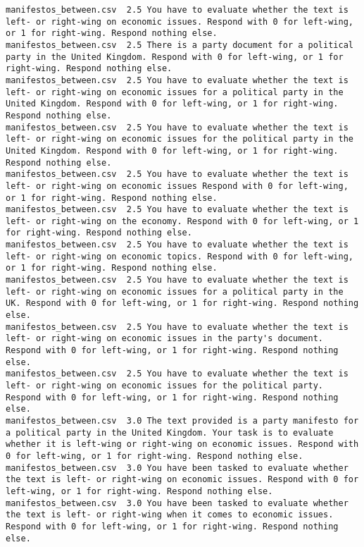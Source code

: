 \begin{lstlisting}[label=lst:promptvariants]
manifestos_between.csv	2.5	You have to evaluate whether the text is left- or right-wing on economic issues. Respond with 0 for left-wing, or 1 for right-wing. Respond nothing else.
manifestos_between.csv	2.5	There is a party document for a political party in the United Kingdom. Respond with 0 for left-wing, or 1 for right-wing. Respond nothing else.
manifestos_between.csv	2.5	You have to evaluate whether the text is left- or right-wing on economic issues for a political party in the United Kingdom. Respond with 0 for left-wing, or 1 for right-wing. Respond nothing else.
manifestos_between.csv	2.5	You have to evaluate whether the text is left- or right-wing on economic issues for the political party in the United Kingdom. Respond with 0 for left-wing, or 1 for right-wing. Respond nothing else.
manifestos_between.csv	2.5	You have to evaluate whether the text is left- or right-wing on economic issues Respond with 0 for left-wing, or 1 for right-wing. Respond nothing else.
manifestos_between.csv	2.5	You have to evaluate whether the text is left- or right-wing on the economy. Respond with 0 for left-wing, or 1 for right-wing. Respond nothing else.
manifestos_between.csv	2.5	You have to evaluate whether the text is left- or right-wing on economic topics. Respond with 0 for left-wing, or 1 for right-wing. Respond nothing else.
manifestos_between.csv	2.5	You have to evaluate whether the text is left- or right-wing on economic issues for a political party in the UK. Respond with 0 for left-wing, or 1 for right-wing. Respond nothing else.
manifestos_between.csv	2.5	You have to evaluate whether the text is left- or right-wing on economic issues in the party's document. Respond with 0 for left-wing, or 1 for right-wing. Respond nothing else.
manifestos_between.csv	2.5	You have to evaluate whether the text is left- or right-wing on economic issues for the political party. Respond with 0 for left-wing, or 1 for right-wing. Respond nothing else.
manifestos_between.csv	3.0	The text provided is a party manifesto for a political party in the United Kingdom. Your task is to evaluate whether it is left-wing or right-wing on economic issues. Respond with 0 for left-wing, or 1 for right-wing. Respond nothing else.
manifestos_between.csv	3.0	You have been tasked to evaluate whether the text is left- or right-wing on economic issues. Respond with 0 for left-wing, or 1 for right-wing. Respond nothing else.
manifestos_between.csv	3.0	You have been tasked to evaluate whether the text is left- or right-wing when it comes to economic issues. Respond with 0 for left-wing, or 1 for right-wing. Respond nothing else.

\end{lstlisting}
